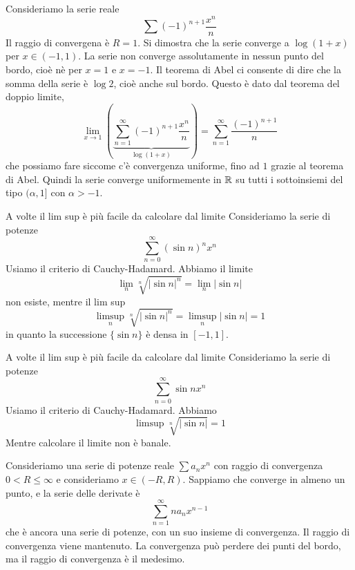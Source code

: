 \documentclass[a4paper]{article}
\begin{document}
\begin{snippetexample}{}
    Consideriamo la serie reale
    \[
        \sum {(-1)}^{n+1} \frac{x^n}{n}
    \]
    Il raggio di convergena è \(R=1\).
    Si dimostra che la serie converge a \(\log(1 + x)\)
    per \(x \in (-1, 1)\).
    La serie non converge assolutamente in nessun punto del bordo,
    cioè nè per \(x=1\) e \(x=-1\).
    Il teorema di Abel ci consente di dire che la somma della serie è \(\log 2\),
    cioè anche sul bordo.
    Questo è dato dal teorema del doppio limite,
    \[
        \lim_{x\to 1} \left(
            \underbrace{\sum_{n=1}^\infty {(-1)}^{n+1} \frac{x^n}{n}}_{\log(1+x)}
        \right) = \sum_{n=1}^\infty \frac{{(-1)}^{n+1}}{n}
    \]
    che possiamo fare siccome c'è convergenza uniforme, fino ad \(1\)
    grazie al teorema di Abel.
    Quindi la serie converge uniformemente in \(\mathbb{R}\)
    su tutti i sottoinsiemi del tipo \((\alpha, 1]\)
    con \(\alpha > -1\).
\end{snippetexample}

\begin{snippetexample}{A volte il lim sup è più facile da calcolare dal limite}
    Consideriamo la serie di potenze
    \[
        \sum_{n=0}^\infty (\sin n)^n x^n
    \]
    Usiamo il criterio di Cauchy-Hadamard. Abbiamo
    il limite
    \[
        \lim_n \sqrt[n]{
            |\sin n|^n
        } = \lim_n |\sin n|
    \]
    non esiste, mentre il lim sup
    \[
        \limsup_n \sqrt[n]{
            |\sin n|^n
        } = \limsup_n |\sin n| = 1
    \]
    in quanto la successione \(\{\sin n\}\) è densa in \([-1, 1]\).
\end{snippetexample}

\begin{snippetexample}{A volte il lim sup è più facile da calcolare dal limite}
    Consideriamo la serie di potenze
    \[
        \sum_{n=0}^\infty \sin n x^n
    \]
    Usiamo il criterio di Cauchy-Hadamard. Abbiamo
    \[
        \limsup \sqrt[n]{
            |\sin n|
        } = 1
    \]
    Mentre calcolare il limite non è banale.
\end{snippetexample}

\begin{snippetproposition}{}
    Consideriamo una serie di potenze reale
    \(\sum a_n x^n\) con raggio di convergenza \(0 < R \leq \infty\)
    e consideriamo \(x \in (-R, R)\).
    Sappiamo che converge in almeno un punto, e la serie delle derivate è
    \[
        \sum_{n=1}^\infty na_nx^{n-1}
    \]
    che è ancora una serie di potenze, con un suo insieme di convergenza.
    Il raggio di convergenza viene mantenuto.
    La convergenza può perdere dei punti del bordo, ma il raggio di convergenza è il medesimo.
\end{snippetproposition}
\end{document}
